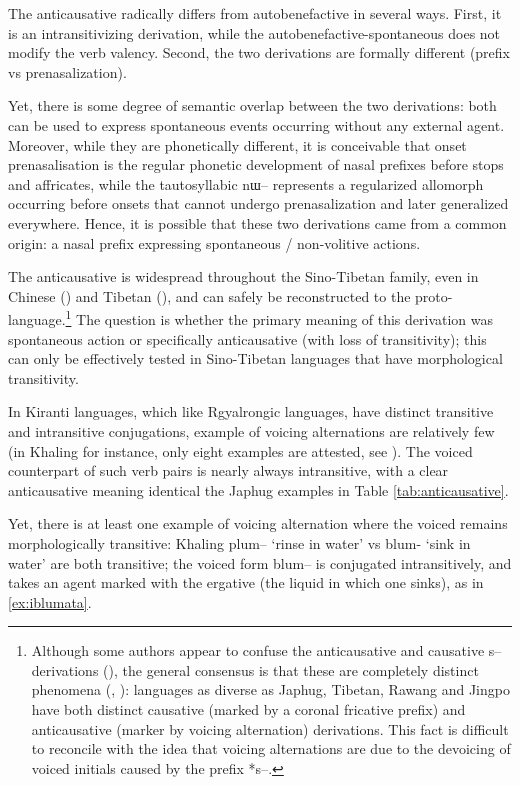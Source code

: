\documentclass[oldfontcommands,oneside,a4paper,11pt]{article}
\newcommand{\ipa}[1]{{\phon \mbox{#1}}} %
\begin{document}
The anticausative radically differs from autobenefactive in several ways. First, it is an intransitivizing derivation, while the autobenefactive-spontaneous does not modify the verb valency. Second, the two derivations are formally different (prefix vs prenasalization). 

Yet, there is some degree of semantic overlap between the two derivations: both can be used to express spontaneous events occurring without any external agent. Moreover, while they are phonetically different, it is conceivable that onset prenasalisation is the regular phonetic development of nasal prefixes before stops and affricates, while the tautosyllabic \ipa{nɯ--} represents a regularized allomorph occurring before onsets that cannot undergo prenasalization and later generalized everywhere. Hence, it is possible that these two derivations came from a common origin: a nasal prefix expressing spontaneous / non-volitive actions. 

The anticausative is widespread throughout the Sino-Tibetan family, even in Chinese (\citealt{sagart12sprefix}) and Tibetan (\citealt{jacques12internal}), and can safely be reconstructed to the proto-language.\footnote{Although some authors appear to  confuse the anticausative and causative \ipa{s--} derivations (\citealt{mei12caus}), the general consensus is that these are completely distinct phenomena (\citealt{lapolla03}, \citealt{hill14voicing}): languages as diverse as  Japhug, Tibetan, Rawang and Jingpo have both distinct causative (marked by a coronal fricative prefix) and anticausative (marker by voicing alternation) derivations. This fact is difficult to reconcile with the idea that voicing alternations are due to the devoicing of voiced initials caused by the prefix *\ipa{s--}.} The question is whether the primary meaning of this derivation was spontaneous action or specifically anticausative (with loss of transitivity); this can only be effectively tested in Sino-Tibetan languages that have  morphological transitivity.

In Kiranti languages, which like Rgyalrongic languages, have distinct transitive and intransitive conjugations, example of voicing alternations are relatively few (in Khaling for instance, only eight examples are attested, see \citealt{jacques13derivational.khaling}). The voiced counterpart of such verb pairs is nearly always intransitive, with a clear anticausative meaning identical the Japhug examples in Table \ref{tab:anticausative}.


Yet, there is at least one example of voicing alternation where the voiced remains morphologically transitive: Khaling \ipa{plum--} `rinse in water' vs \ipa{blum-} `sink in water' are both transitive; the voiced form \ipa{blum--} is conjugated intransitively, and takes an agent marked with the ergative (the liquid in which one sinks), as in \ref{ex:iblumata}.
\end{document}
